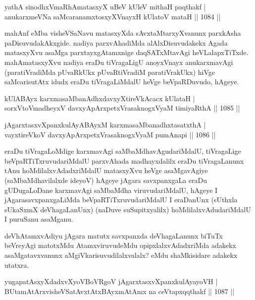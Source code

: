 \begin{shl}
yathA sinodhxVmaRhAmatasxyX uBeV kUleV mithaH paqthakf | \\
anukarxmeVNa saMcaranamxtosxyXV\s nayxH kUlatoV mataH \hfill||  1084 ||  
\end{shl}

\begin{artha}
mahAnf eMba visheVSaNavu matasxyXda sAvxtaMtarxyXvanunx parxkAsha paDisuvudakAkxgide. nadiya parxvAhadiMda alAlxDisuvudakekx Agada matasxyXvu asaMga parxtayxgAtamxnige daqSATxMtavAgi heVLalapxTiTxde. mahAmatasxyXvu nadiya eraDu tiVragaLigU anoyxVnayx anukarxmavAgi (paratiVradiMda pUvaRkUkx pUvaRtiVradiM paratiVrakUkx) hiVge saMcarisutAtx idudx eraDu tiVragaLiMdalU heVge beVpaRDuvudo, hAgeye.
\end{artha}


\begin{shl}
kUlABAyx karxmasaMbanAdhxdavxyXtireVkAcacx kUlataH | \\
sorxVtoVmadheyxV davxyApArxpetxVrasaknogxV\s yaM timiyaRthA \hfill||  1085 ||  
\end{shl}
				
\begin{shl}
jAgarxtasxvXpanxkulAyABAyxM karxmasaMbanadhxtasatxthA | \\
vayxtireVkoV davxyApArxpetxVrasaknogxV\s yaM pumAnapi \hfill||  1086 || 
\end{shl}

\begin{artha}
eraDu tiVragaLoMdige karxmavAgi saMbaMdhavAgudariMdalU, tiVragaLige beVpaRTiTxruvudariMdalU parxvAhada madhayxdalilx eraDu tiVragaLanunx tAnu hoMdilalxvAdadxriMdalU matasxyXvu heVge asaMgavAgiye (saMbaMdhavilalxde ideyoV) hAgeye jAgara savxpanxgaLa eraDu gUDugaLoDane karxmavAgi saMbaMdha viruvudariMdalU, hAgeye I jAgarasavxpanxgaLiMda beVpaRTiTxruvudariMdalU I eraDanUnx (sUthxla sUkaSxmX deVhagaLanUnx) (naDuve suSupitxyalilx) hoMdilalxvAdudariMdalU I puruSanu asaMganu.
\end{artha}

\begin{artha}
deVhAtamxvAdiyu jAgara matutx savxpanxda deVhagaLanunx biTuTx beVreyAgi matotxMdu AtamxviruvudeMdu opipxlalxvAdadxriMda adakekx asaMgatavxvanunx aMgiVkarisuvudilalxvalalx? eMdu shaMkisidare adakekx utatxra.
\end{artha}

\begin{shl}
yugapatAsxyXdadxvXyoVBoVRgoV jAgarxtasxvXpanxkulAyayoVH | \\
BUtamAtArxvisheVSatAvxtAtxBAyxmAtAmx na ceVtapxqqthakf \hfill||  1087 ||  
\end{shl}

